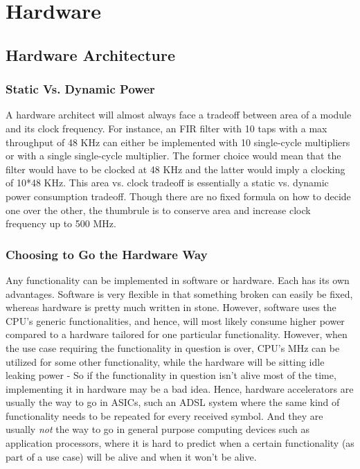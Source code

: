 \part{Hardware}
\chapter{Hardware Architecture}
\label{chap:partHwHwArch}
\section{Static Vs. Dynamic Power}
A hardware architect will almost always face a tradeoff between area of a module and its clock frequency. For instance, an FIR filter with 10 taps with a max throughput of 48 KHz can either be implemented with 10 single-cycle multipliers or with a single single-cycle multiplier. The former choice would mean that the filter would have to be clocked at 48 KHz and the latter would imply a clocking of 10*48 KHz. This area vs. clock tradeoff is essentially a static vs. dynamic power consumption tradeoff. Though there are no fixed formula on how to decide one over the other, the thumbrule is to conserve area and increase clock frequency up to 500 MHz. 

\section{Choosing to Go the Hardware Way}
Any functionality can be implemented in software or hardware. Each has its own advantages. Software is very flexible in that something broken can easily be fixed, whereas hardware is pretty much written in stone. However, software uses the CPU's generic functionalities, and hence, will most likely consume higher power compared to a hardware tailored for one particular functionality. However, when the use case requiring the functionality in question is over, CPU's MHz can be utilized for some other functionality, while the hardware will be sitting idle leaking power - So if the functionality in question isn't alive most of the time, implementing it in hardware may be a bad idea. Hence, hardware accelerators are usually the way to go in ASICs, such an ADSL system where the same kind of functionality needs to be repeated for every received symbol. And they are usually \emph{not} the way to go in general purpose computing devices such as application processors, where it is hard to predict when a certain functionality (as part of a use case) will be alive and when it won't be alive. 

